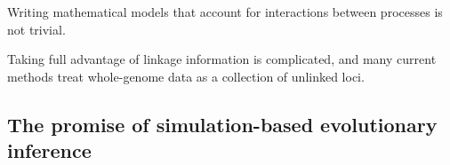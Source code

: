 Writing mathematical models that account for interactions between processes is not trivial.

Taking full advantage of linkage information is complicated, and many current methods treat whole-genome data as a collection of unlinked loci.

\subsection{The promise of simulation-based evolutionary inference}






